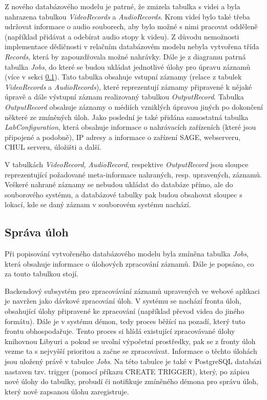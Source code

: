 \documentclass[thesis=M,czech]{FITthesis}[2012/06/26]
\begin{document}
Z nového databázového modelu je patrné, že zmizela tabulka s videi a byla nahrazena tabulkou \textit{VideoRecords} a \textit{AudioRecords}. Krom videí bylo také třeba udržovat informace o audio souborech, aby bylo možné s nimi pracovat odděleně (například přidávat a odebírat audio stopy k videu). Z důvodu nemožnosti implementace dědičnosti v relačním databázovém modelu nebyla vytvořena třída \textit{Records}, která by zapouzdřovala možné nahrávky. Dále je z diagramu patrná tabulka \textit{Jobs},  do které se budou ukládat jednotlivé úlohy pro úpravu záznamů (více v sekci \ref{subsec:navrh_backend_ulohy}). Tato tabulka obsahuje vstupní záznamy (relace z tabulek \textit{VideoRecords} a \textit{AudioRecords}), které reprezentují záznamy připravené k nějaké úpravě a dále výstupní záznam realizovaný tabulkou \textit{OutputRecord}. Tabulka \textit{OutputRecord} obsahuje záznamy o médiích vzniklých úpravou jiných po dokončení některé ze zmíněných úloh. Jako poslední je také přidána samostatná tabulka \textit{LabConfiguration}, která obsahuje informace o nahrávacích zařízeních (které jsou připojené a podobně), IP adresy a informace o zařízení SAGE, webserveru, CHUL serveru, úložišti a další.

V tabulkách \textit{VideoRecord}, \textit{AudioRecord}, respektive \textit{OutputRecord} jsou sloupce reprezentující požadované meta-informace nahraných, resp. upravených, záznamů. Veškeré nahrané záznamy se nebudou ukládat do databáze přímo, ale do souborového systému, a databázové tabulky pak budou obsahovat sloupec s lokací, kde se daný záznam v souborovém systému nachází.


\subsection{Správa úloh} \label{subsec:navrh_backend_ulohy}
Při popisování vytvořeného databázového modelu byla zmíněna tabulka \textit{Jobs}, která obsahuje informace o úlohových zpracování záznamů. Dále je popsáno, co za touto tabulkou stojí.

Backendový subsystém pro zpracovávání záznamů upravených ve webové aplikaci je navržen jako dávkové zpracování úloh. V systému se nachází fronta úloh, obsahující úlohy připravené ke zpracování (například převod videa do jiného formátu). Dále je v systému démon, tedy proces běžící na pozadí, který tuto frontu obhospodařuje. Tento proces si hlídá existující zpracovávané úlohy knihovnou Libyuri a pokud se uvolní výpočetní prostředky, pak se z fronty úloh vezme ta s nejvyšší prioritou a začne se zpracovávat. Informace o těchto úlohách jsou uložený právě v tabulce \textit{Jobs}. Na této tabulce je také v PostgreSQL databázi nastaven tzv. trigger (pomocí příkazu CREATE TRIGGER), který, po zápisu nové úlohy do tabulky, probudí či notifikuje zmíněného démona pro správu úloh, který nově zapsanou úlohu zaregistruje.
\end{document}
